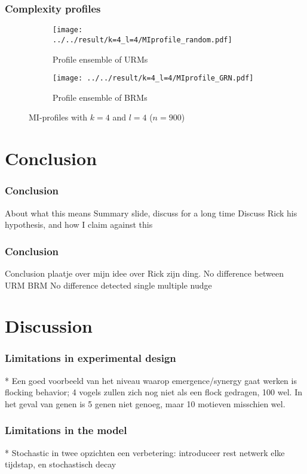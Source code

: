 \documentclass[hyperref={pdfpagelabels=false}]{beamer}
\begin{document}
\begin{frame}
\frametitle{Complexity profiles}
\begin{figure}[ht]
    \centering
    \begin{subfigure}[b]{0.4\textwidth}
        \texttt{[image: ../../result/k=4\_l=4/MIprofile\_random.pdf]}
        \caption{Profile ensemble of URMs}
    \end{subfigure}
    \begin{subfigure}[b]{0.4\textwidth}
        \texttt{[image: ../../result/k=4\_l=4/MIprofile\_GRN.pdf]}
        \caption{Profile ensemble of BRMs}
    \end{subfigure}
    \caption{MI-profiles with $k=4$ and $l=4$ ($n=900$)}
    \label{fig:profilel4}
\end{figure}
\end{frame}

\section{Conclusion}
\setcounter{subsection}{1}

\begin{frame}
\frametitle{Conclusion}
About what this means
Summary slide, discuss for a long time
Discuss Rick his hypothesis, and how I claim against this
\end{frame}

\begin{frame}
\frametitle{Conclusion}
Conclusion plaatje over mijn idee over Rick zijn ding.
No difference between URM BRM
No difference detected single multiple nudge
\end{frame}

\section{Discussion}
\setcounter{subsection}{1}

\begin{frame}
\frametitle{Limitations in experimental design}
* Een goed voorbeeld van het niveau waarop emergence/synergy gaat werken is flocking behavior; 4 vogels zullen zich nog niet als een flock gedragen, 100 wel. In het geval van genen is 5 genen niet genoeg, maar 10 motieven misschien wel.
\end{frame}

\begin{frame}
\frametitle{Limitations in the model}
* Stochastic in twee opzichten een verbetering: introduceer rest netwerk elke tijdstap, en stochastisch decay
\end{frame}
\end{document}
